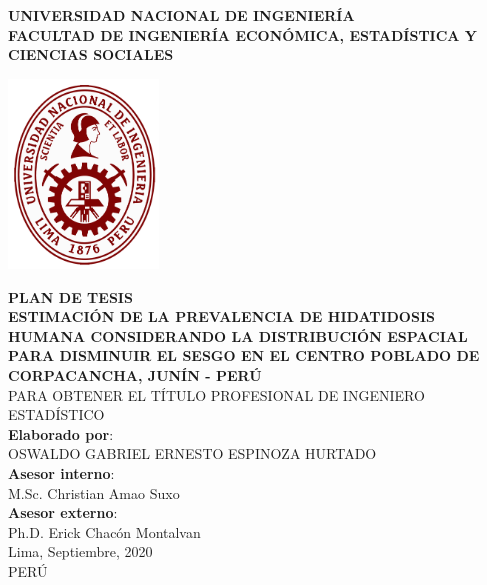 \documentclass[11pt, spanish]{article}
\begin{document}
\begin{titlepage}
\begin{center}
 {\Large \bf UNIVERSIDAD NACIONAL DE INGENIERÍA}\\[0.5cm]
{\bf FACULTAD DE INGENIERÍA ECONÓMICA, ESTADÍSTICA Y CIENCIAS SOCIALES}\\[1.5cm]
\begin{center}
\includegraphics[width=0.3\textwidth]{images/Logo.png}
\end{center}
\vspace{1cm}
\title{} %
{\bf \large PLAN DE TESIS}\\[0.5cm]
{\bf \large ESTIMACIÓN DE LA PREVALENCIA DE HIDATIDOSIS HUMANA CONSIDERANDO LA DISTRIBUCIÓN ESPACIAL PARA DISMINUIR EL SESGO EN EL CENTRO POBLADO DE CORPACANCHA, JUNÍN - PERÚ}\\ [0.5cm] %
{PARA OBTENER EL TÍTULO PROFESIONAL DE INGENIERO ESTADÍSTICO}\\[1cm]
{{\bf Elaborado por}:\\ OSWALDO GABRIEL ERNESTO ESPINOZA HURTADO}\\[0.75cm] %
{{\bf Asesor interno}:\\ M.Sc. Christian Amao Suxo}\\ [0.5cm]
{{\bf Asesor externo}:\\ Ph.D. Erick Chacón Montalvan}\\ [0.75cm]  %
{\large Lima, Septiembre, 2020}\\[0.2cm] %
{PERÚ}
\end{center}
\end{titlepage}

\newpage
{}
\tableofcontents
\newpage

\newpage

\newpage

\newpage

\newpage


\end{document}
